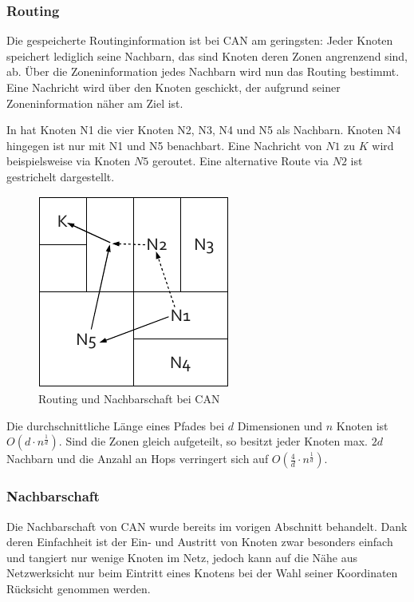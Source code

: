 \subsubsection{Routing} 
Die gespeicherte Routinginformation ist bei CAN am geringsten: Jeder Knoten speichert lediglich seine Nachbarn, das sind Knoten deren Zonen angrenzend sind, ab. Über die Zoneninformation jedes Nachbarn wird nun das Routing bestimmt. Eine Nachricht wird über den Knoten geschickt, der aufgrund seiner Zoneninformation näher am Ziel ist.

In  hat Knoten N1 die vier Knoten N2, N3, N4 und N5 als Nachbarn. Knoten N4 hingegen ist nur mit N1 und N5 benachbart. Eine Nachricht von $N1$ zu $K$ wird beispielsweise via Knoten $N5$ geroutet. Eine alternative Route via $N2$ ist gestrichelt dargestellt.

\begin{figure}[htbp]
\centering
\includegraphics{grafics/can_routing.pdf}
\caption{Routing und Nachbarschaft bei CAN}
\label{fig:can_routing}
\end{figure}

Die durchschnittliche Länge eines Pfades bei $d$ Dimensionen und $n$ Knoten ist $O(d\cdot n^\frac{1}{d})$. Sind die Zonen gleich aufgeteilt, so besitzt jeder Knoten max. $2d$ Nachbarn und die Anzahl an Hops verringert sich auf $O(\frac{4}{d}\cdot n^\frac{1}{d})$.

\subsubsection{Nachbarschaft}
Die Nachbarschaft von CAN wurde bereits im vorigen Abschnitt behandelt. Dank deren Einfachheit ist der Ein- und Austritt von Knoten zwar besonders einfach und tangiert nur wenige Knoten im Netz, jedoch kann auf die Nähe aus Netzwerksicht nur beim Eintritt eines Knotens bei der Wahl seiner Koordinaten Rücksicht genommen werden.

